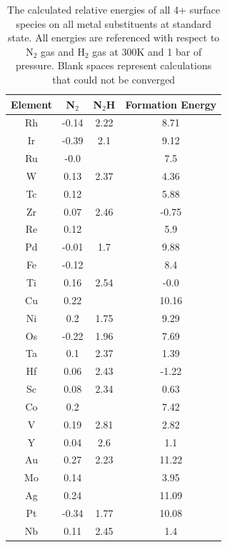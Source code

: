 \begin{table}
\begin{center}
\begin{tabular}{| c | c | c | c |}
\hline
Element & N$_2$ & N$_2$H & Formation Energy \\
\hline
Rh & -0.14 & 2.22 & 8.71 \\
Ir & -0.39 & 2.1 & 9.12 \\
Ru & -0.0 &  & 7.5 \\
W & 0.13 & 2.37 & 4.36 \\
Tc & 0.12 &  & 5.88 \\
Zr & 0.07 & 2.46 & -0.75 \\
Re & 0.12 &  & 5.9 \\
Pd & -0.01 & 1.7 & 9.88 \\
Fe & -0.12 &  & 8.4 \\
Ti & 0.16 & 2.54 & -0.0 \\
Cu & 0.22 &  & 10.16 \\
Ni & 0.2 & 1.75 & 9.29 \\
Os & -0.22 & 1.96 & 7.69 \\
Ta & 0.1 & 2.37 & 1.39 \\
Hf & 0.06 & 2.43 & -1.22 \\
Sc & 0.08 & 2.34 & 0.63 \\
Co & 0.2 &  & 7.42 \\
V & 0.19 & 2.81 & 2.82 \\
Y & 0.04 & 2.6 & 1.1 \\
Au & 0.27 & 2.23 & 11.22 \\
Mo & 0.14 &  & 3.95 \\
Ag & 0.24 &  & 11.09 \\
Pt & -0.34 & 1.77 & 10.08 \\
Nb & 0.11 & 2.45 & 1.4 \\
\hline
\end{tabular}
\end{center}
\caption{The calculated relative energies of all 4+ surface species on all metal substituents at standard state. All energies are referenced with respect to N$_2$ gas and H$_2$ gas at 300K and 1 bar of pressure. Blank spaces represent calculations that could not be converged}
\hline
\end{table}

